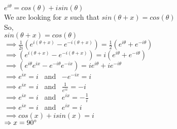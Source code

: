 \begin{enumerate}
\tab \tab $e^{i\theta} = cos(\theta) + i sin(\theta)$\\

We are looking for $x$ such that $sin(\theta + x) = cos(\theta)$\\

So, \\

\tab \tab $sin(\theta + x) = cos(\theta)$\\

\tab \tab $\implies \frac{1}{2i}(e^{i(\theta + x)} - e^{-i(\theta + x)})= \frac{1}{2}(e^{i\theta} + e^{-i\theta})$\\

\tab \tab $\implies (e^{i(\theta + x)} - e^{-i(\theta + x)})= i(e^{i\theta} + e^{-i\theta})$\\

\tab \tab $\implies (e^{i\theta}e^{ix} - e^{-i\theta}e^{-ix})= ie^{i\theta} + ie^{-i\theta}$\\

\tab \tab $\implies e^{ix} = i$ \ and \ $-e^{-ix} = i$\\

\tab \tab $\implies e^{ix} = i$ \ and \ $\frac{1}{e^{ix}} = -i$\\

\tab \tab $\implies e^{ix} = i$ \ and \ $e^{ix} = -\frac{1}{i}$\\

\tab \tab $\implies e^{ix} = i$ \ and \ $e^{ix} = i$\\

\tab \tab $\implies cos(x) + isin(x) = i$\\

\tab \tab $\Rightarrow x = 90^\circ$\\

\end{enumerate}
